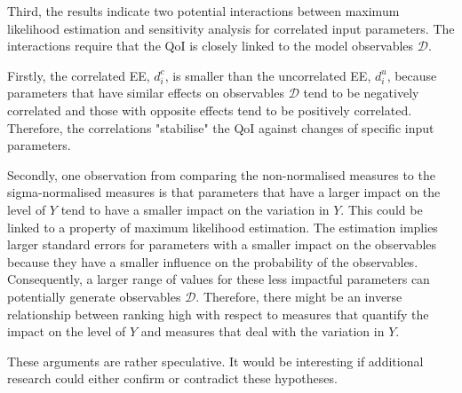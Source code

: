 \noindent
Third, the results indicate two potential interactions between maximum likelihood estimation and sensitivity analysis for correlated input parameters. The interactions require that the QoI is closely linked to the model observables $\pmb{\mathcal{D}}$.

Firstly, the correlated EE, $d_i^{c}$, is smaller than the uncorrelated EE, $d_i^{u}$, because parameters that have similar effects on observables $\pmb{\mathcal{D}}$ tend to be negatively correlated and those with opposite effects tend to be positively correlated. Therefore, the correlations "stabilise" the QoI against changes of specific input parameters.

Secondly, one observation from comparing the non-normalised measures to the sigma-normalised measures is that parameters that have a larger impact on the level of $Y$ tend to have a smaller impact on the variation in $Y$. This could be linked to a property of maximum likelihood estimation. The estimation implies larger standard errors for parameters with a smaller impact on the observables because they have a smaller influence on the probability of the observables. Consequently, a larger range of values for these less impactful parameters can potentially generate observables $\pmb{\mathcal{D}}$. Therefore, there might be an inverse relationship between ranking high with respect to measures that quantify the impact on the level of $Y$ and measures that deal with the variation in $Y$.

These arguments are rather speculative. It would be interesting if additional research could either confirm or contradict these hypotheses.
